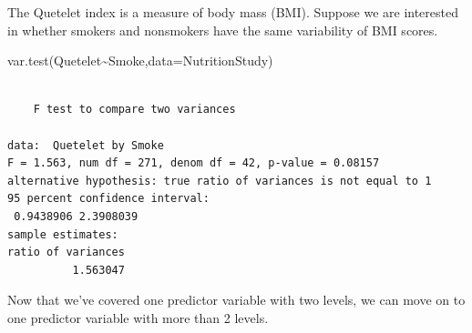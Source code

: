 \documentclass[
  letterpaper,
  DIV=11,
  numbers=noendperiod]{scrartcl}
\newenvironment{Shaded}{\begin{snugshade}}{\end{snugshade}}
\newcommand{\AttributeTok}[1]{\textcolor[rgb]{0.40,0.45,0.13}{#1}}
\newcommand{\FunctionTok}[1]{\textcolor[rgb]{0.28,0.35,0.67}{#1}}
\newcommand{\NormalTok}[1]{\textcolor[rgb]{0.00,0.23,0.31}{#1}}
\newcommand{\SpecialCharTok}[1]{\textcolor[rgb]{0.37,0.37,0.37}{#1}}
\begin{document}
The Quetelet index is a measure of body mass (BMI). Suppose we are
interested in whether smokers and nonsmokers have the same variability
of BMI scores.

\hfill\break
\hfill\break
\hfill\break
\hfill\break

\begin{Shaded}
\begin{Highlighting}[]
\FunctionTok{var.test}\NormalTok{(Quetelet}\SpecialCharTok{\textasciitilde{}}\NormalTok{Smoke,}\AttributeTok{data=}\NormalTok{NutritionStudy)}
\end{Highlighting}
\end{Shaded}

\begin{verbatim}

    F test to compare two variances

data:  Quetelet by Smoke
F = 1.563, num df = 271, denom df = 42, p-value = 0.08157
alternative hypothesis: true ratio of variances is not equal to 1
95 percent confidence interval:
 0.9438906 2.3908039
sample estimates:
ratio of variances 
          1.563047 
\end{verbatim}

Now that we've covered one predictor variable with two levels, we can
move on to one predictor variable with more than 2 levels.
\end{document}
